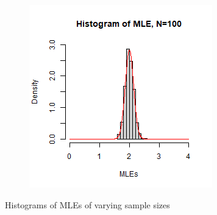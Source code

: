 \begin{figure}[h]
\begin{subfigure}
    \end{subfigure}
    \begin{subfigure}
        \centering
        \includegraphics[scale=0.6]{../../../misc/N100.jpg}
    \end{subfigure}
	\caption{Histograms of MLEs of varying sample sizes}
	\label{hist}
\end{figure}

